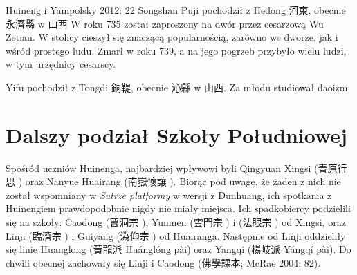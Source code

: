 Huineng i Yampolsky 2012: 22
Songshan Puji pochodził z Hedong 河東, obecnie 永濟縣 w 山西
W roku 735 został zaproszony na dwór przez cesarzową Wu Zetian. W stolicy cieszył się znaczącą popularnością, zarówno we dworze, jak i wśród prostego ludu.
Zmarł w roku 739, a na jego pogrzeb przybyło wielu ludzi, w tym urzędnicy cesarscy.

Yifu pochodził z Tongdi 銅鞮, obecnie 沁縣 w 山西.
Za młodu studiował daoizm
\fi

\section{Dalszy podział Szkoły Południowej}
Spośród uczniów Huinenga, najbardziej wpływowi byli Qingyuan Xingsi (青原行思 ) oraz Nanyue Huairang (南嶽懷讓 ).
Biorąc pod uwagę, że żaden z nich nie został wspomniany w \textit{Sutrze platformy} w wersji z Dunhuang, ich spotkania z Huinengiem prawdopodobnie nigdy nie miały miejsca.
Ich spadkobiercy podzielili się na szkoły: Caodong (曹洞宗 ), Yunmen (雲門宗 ) i (法眼宗 ) od Xingsi, oraz Linji (臨濟宗 ) i Guiyang (溈仰宗 ) od Huairanga.
Następnie od Linji oddzieliły się linie Huanglong (黃龍派 Huánglóng pài) oraz Yangqi (楊岐派 Yángqí pài). Do chwili obecnej zachowały się Linji i Caodong
(佛學課本; McRae 2004: 82).


